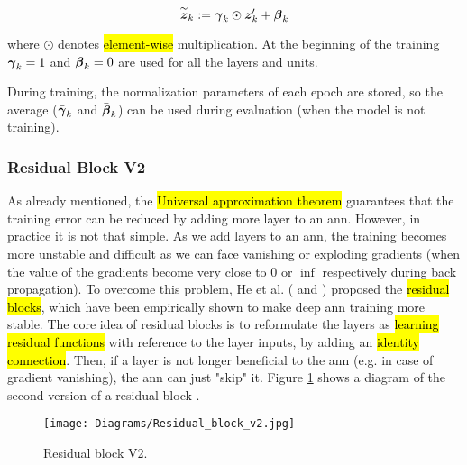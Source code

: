 \begin{equation}
    \overset{\sim}{\boldsymbol{z}}_k := \boldsymbol{\gamma}_k \odot \boldsymbol{z}'_k + \boldsymbol{\beta}_k
\end{equation}

\noindent where $\odot$ denotes \hl{element-wise} multiplication. At the beginning of the training $\boldsymbol{\gamma}_k=1$ and $\boldsymbol{\beta}_k=0$ are used for all the layers and units.

During training, the normalization parameters of each epoch are stored, so the average ($\bar{\boldsymbol{\gamma}}_k$ and $\bar{\boldsymbol{\beta}}_k$) can be used during evaluation (when the model is not training).

\subsubsection{Residual Block V2}

As already mentioned, the \hl{Universal approximation theorem} guarantees that the training error can be reduced by adding more layer to an \gls{ann}. However, in practice it is not that simple. As we add layers to an \gls{ann}, the training becomes more unstable and difficult as we can face vanishing or exploding gradients (when the value of the gradients become very close to 0 or $\inf$ respectively during back propagation). To overcome this problem, He et al. (\cite{he2015deep} and \cite{he2016identity}) proposed the \hl{residual blocks}, which have been empirically shown to make deep \gls{ann} training more stable.
The core idea of residual blocks is to reformulate the layers as \hl{learning residual functions} with reference to the layer inputs, by adding an \hl{identity connection}. Then, if a layer is not longer beneficial to the \gls{ann} (e.g. in case of gradient vanishing), the \gls{ann} can just "skip" it. Figure \ref{fig:basics:residual_block} shows a diagram of the second version of a residual block \cite{he2016identity}.

\begin{figure}[!ht]
  \centering
  \texttt{[image: Diagrams/Residual\_block\_v2.jpg]}
  \caption{Residual block V2.}
  \label{fig:basics:residual_block}
\end{figure}

